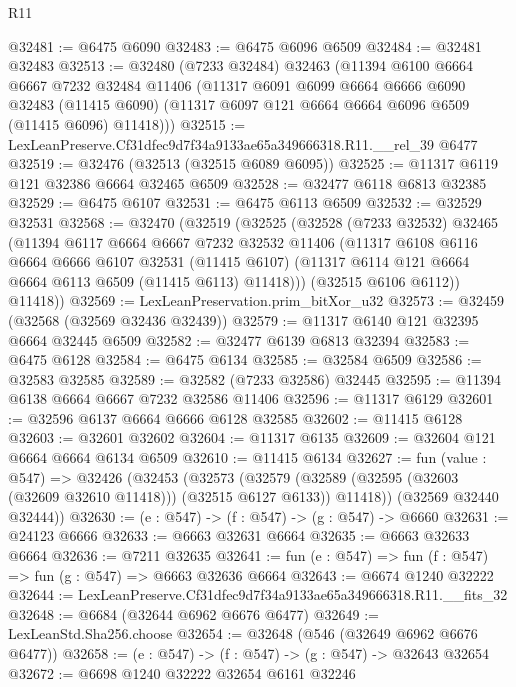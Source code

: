 \begin{lexlean}{R11}
\begin{coremodule}
@32481 := @6475 @6090
@32483 := @6475 @6096 @6509
@32484 := @32481 @32483
@32513 := @32480
    (@7233 @32484)
    @32463
    (@11394
      @6100
      @6664
      @6667
      @7232
      @32484
      @11406
      (@11317
        @6091
        @6099
        @6664
        @6666
        @6090
        @32483
        (@11415 @6090)
        (@11317 @6097 @121 @6664 @6664 @6096 @6509 (@11415 @6096) @11418)))
@32515 := LexLeanPreserve.Cf31dfec9d7f34a9133ae65a349666318.R11.__rel_39 @6477
@32519 := @32476 (@32513 (@32515 @6089 @6095))
@32525 := @11317 @6119 @121 @32386 @6664 @32465 @6509
@32528 := @32477 @6118 @6813 @32385
@32529 := @6475 @6107
@32531 := @6475 @6113 @6509
@32532 := @32529 @32531
@32568 := @32470
    (@32519
      (@32525
        (@32528
          (@7233 @32532)
          @32465
          (@11394
            @6117
            @6664
            @6667
            @7232
            @32532
            @11406
            (@11317
              @6108
              @6116
              @6664
              @6666
              @6107
              @32531
              (@11415 @6107)
              (@11317 @6114 @121 @6664 @6664 @6113 @6509 (@11415 @6113) @11418)))
          (@32515 @6106 @6112))
        @11418))
@32569 := LexLeanPreservation.prim_bitXor_u32
@32573 := @32459 (@32568 (@32569 @32436 @32439))
@32579 := @11317 @6140 @121 @32395 @6664 @32445 @6509
@32582 := @32477 @6139 @6813 @32394
@32583 := @6475 @6128
@32584 := @6475 @6134
@32585 := @32584 @6509
@32586 := @32583 @32585
@32589 := @32582 (@7233 @32586) @32445
@32595 := @11394 @6138 @6664 @6667 @7232 @32586 @11406
@32596 := @11317 @6129
@32601 := @32596 @6137 @6664 @6666 @6128 @32585
@32602 := @11415 @6128
@32603 := @32601 @32602
@32604 := @11317 @6135
@32609 := @32604 @121 @6664 @6664 @6134 @6509
@32610 := @11415 @6134
@32627 := fun (value : @547) =>
  @32426
    (@32453
      (@32573
        (@32579 (@32589 (@32595 (@32603 (@32609 @32610 @11418))) (@32515 @6127 @6133)) @11418))
      (@32569 @32440 @32444))
@32630 := (e : @547) -> (f : @547) -> (g : @547) -> @6660
@32631 := @24123 @6666
@32633 := @6663 @32631 @6664
@32635 := @6663 @32633 @6664
@32636 := @7211 @32635
@32641 := fun (e : @547) => fun (f : @547) => fun (g : @547) => @6663 @32636 @6664
@32643 := @6674 @1240 @32222
@32644 := LexLeanPreserve.Cf31dfec9d7f34a9133ae65a349666318.R11.__fits_32
@32648 := @6684 (@32644 @6962 @6676 @6477)
@32649 := LexLeanStd.Sha256.choose
@32654 := @32648 (@546 (@32649 @6962 @6676 @6477))
@32658 := (e : @547) -> (f : @547) -> (g : @547) -> @32643 @32654
@32672 := @6698
    @1240
    @32222
    @32654
    @6161
    @32246

\end{coremodule}
\end{lexlean}
